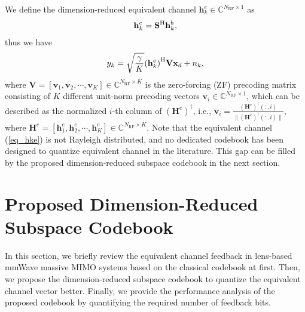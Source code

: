 \documentclass[10pt,twocolumn,twoside]{IEEEtran}
\begin{document}
We define the dimension-reduced equivalent channel $\mathbf{h}_k^e\in\mathbb{C}^{N_\text{RF}\times 1}$ as
\begin{align}\label{eq_hke}
\mathbf{h}_k^e=\mathbf{S}^{\rm{H}}\mathbf{h}^b_k,
\end{align}
thus we have
\begin{align}\label{eq_yk2}
y_k =\sqrt{\frac{\gamma}{K}}{(\mathbf{h}_k^e)}^{\rm{H}}\mathbf{V}\mathbf{x}_d + n_k,
\end{align}
where $\mathbf{V}=[\mathbf{v}_1,\mathbf{v}_2,\cdots,\mathbf{v}_K]\in\mathbb{C}^{N_\text{RF}\times K}$ is the zero-forcing (ZF) precoding matrix consisting of $K$ different unit-norm precoding vectors $\mathbf{v}_i\in\mathbb{C}^{N_\text{RF}\times 1}$,
which can be described as the normalized $i$-th column of ${(\mathbf{H}^e)}^\dagger$, i.e., $\mathbf{v}_i=\frac{{(\mathbf{H}^e)}^\dagger(:,i)}{\|{(\mathbf{H}^e)}^\dagger(:,i)\|}$, where $\mathbf{H}^e=[{\mathbf{h}_1^e},{\mathbf{h}_2^e},\cdots,{\mathbf{h}_K^e}] \in\mathbb{C}^{N_\text{RF}\times K}$.
Note that the equivalent channel (\ref{eq_hke}) is not Rayleigh distributed, and no dedicated codebook has been designed to quantize equivalent channel in the literature.
This gap can be filled by the proposed dimension-reduced subspace codebook in the next section.

\section{Proposed Dimension-Reduced Subspace Codebook}\label{S3}
In this section,
we briefly review the equivalent channel feedback in lens-based mmWave massive MIMO systems based on the classical codebook at first.
Then, we propose the dimension-reduced subspace codebook to quantize the equivalent channel vector better.
Finally, we provide the performance analysis of the proposed codebook by quantifying the required number of feedback bits.
\end{document}
